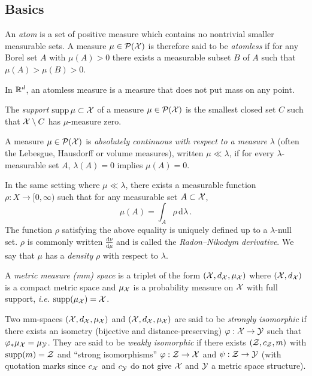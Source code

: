     \subsection{Basics}
        \begin{defi}[Atom]\label{def:atom}
            An \emph{atom} is a set of positive measure which contains no nontrivial smaller measurable sets. A measure $\mu\in\mathcal{P}(\mathcal{X})$ is therefore said to be \emph{atomless} if for any Borel set $A$ with $\mu(A)>0$ there exists a measurable subset $B$ of $A$ such that $\mu (A)>\mu (B)>0$.
        \end{defi}
        \begin{example}
            In $\mathbb{R}^d$, an atomless measure is a measure that does not put mass on any point.
        \end{example}
        \begin{defi}[Support]\label{def:support}The \emph{support} $\operatorname{supp}\mu\subset \mathcal{X}$ of a measure $\mu\in\mathcal{P}(\mathcal{X})$ is the smallest closed set $C$ such that $\mathcal{X}\setminus C$ has $\mu$-measure zero.\end{defi}
        \begin{defi}\label{def:ac}
            A measure $\mu\in\mathcal{P}(\mathcal{X})$ is \emph{absolutely continuous with respect to a measure} $\lambda$ (often the Lebesgue, Hausdorff or volume measures), written $\mu\ll\lambda$, if for every $\lambda$-measurable set $A$, $\lambda(A) = 0$ implies $\mu (A)=0$.
        \end{defi}
        \begin{theorem}
            In the same setting where $\mu \ll \lambda$, there exists a measurable function $\rho:X\to [0,\infty )$ such that for any measurable set $A\subset \mathcal{X}$,
            $$\mu (A)=\int _{A}\rho\,\mathrm d\lambda\, .$$
            The function $\rho$ satisfying the above equality is uniquely defined up to a $\lambda$-null set. $\rho$ is commonly written $\frac {\mathrm d\nu }{\mathrm d\mu }$ and is called the \emph{Radon--Nikodym derivative}. We say that $\mu$ has a \emph{density} $\rho$ with respect to $\lambda$.
        \end{theorem}
        \begin{defi}\label{def:mms}
            A \emph{metric measure (mm) space} is a triplet of the form $(\mathcal{X}, d_{\mathcal{X}} , \mu_{\mathcal{X}})$ where $(\mathcal{X}, d_{\mathcal{X}})$ is a compact metric space and $\mu_{\mathcal{X}}$ is a probability measure on $\mathcal{X}$ with full support, \textit{i.e.} $\operatorname{supp}(\mu_{\mathcal{X}})=\mathcal{X}$.

            Two mm-spaces $(\mathcal{X}, d_{\mathcal{X}} , \mu_{\mathcal{X}})$ and $(\mathcal{X}, d_{\mathcal{X}} , \mu_{\mathcal{X}})$ are said to be \emph{strongly isomorphic} if there exists an isometry (bijective and distance-preserving) $\varphi:\mathcal{X}\to\mathcal{Y}$ such that $\varphi_*\mu_{\mathcal{X}}=\mu_{\mathcal{Y}}$. They are said to be \emph{weakly isomorphic} if there exists $(\mathcal{Z},c_{\mathcal{Z}},m)$ with $\operatorname{supp}(m)=\mathcal{Z}$ and ``strong isomorphisms'' $\varphi:\mathcal{Z}\to\mathcal{X}$ and $\psi:\mathcal{Z}\to\mathcal{Y}$ (with quotation marks since $c_{\mathcal{X}}$ and $c_{\mathcal{Y}}$ do not give $\mathcal{X}$ and $\mathcal{Y}$ a metric space structure).
        \end{defi}
